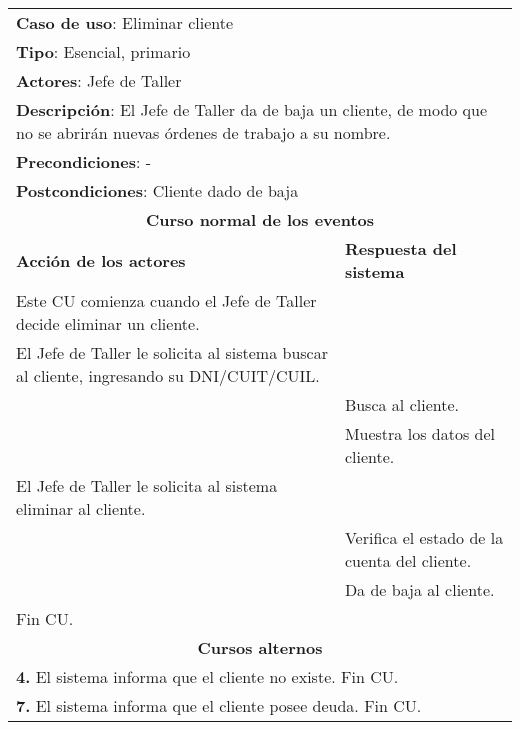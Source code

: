 


	\begin{longtable}{ |p{8cm}|p{8cm}| }
		\hline
		\multicolumn{2}{|p{16cm}|}{\textbf{Caso de uso}: Eliminar cliente}\\
		\multicolumn{2}{|p{16cm}|}{\textbf{Tipo}: Esencial, primario}\\
		\multicolumn{2}{|p{16cm}|}{\textbf{Actores}: Jefe de Taller}\\
		\multicolumn{2}{|p{16cm}|}{\textbf{Descripción}: El Jefe de Taller da de baja un cliente, de modo que no se abrirán nuevas órdenes de trabajo a su nombre.}\\
		\multicolumn{2}{|p{16cm}|}{\textbf{Precondiciones}: -}\\
		\multicolumn{2}{|p{16cm}|}{\textbf{Postcondiciones}: Cliente dado de baja}\\
		\hline
		\multicolumn{2}{|c|}{\textbf{Curso normal de los eventos}}\\
		\hline
		\textbf{Acción de los actores} & \textbf{Respuesta del sistema}\\
		\hline
			\inc Este CU comienza cuando el Jefe de Taller decide eliminar un cliente.& \\
			\hline
			\inc  El Jefe de Taller le solicita al sistema buscar al cliente, ingresando su DNI/CUIT/CUIL. & \\
			\hline
			& \inc Busca al cliente. \\
			\hline
			& \inc Muestra los datos del cliente. \\
			\hline
			\inc El Jefe de Taller le solicita al sistema eliminar al cliente.&\\
			\hline
			& \inc Verifica el estado de la cuenta del cliente. \\
			\hline
			& \inc Da de baja al cliente. \\
			\hline
			\inc Fin CU. & \\
		\hline
		\multicolumn{2}{|c|}{\textbf{Cursos alternos}}\\
		\hline
		\multicolumn{2}{|p{16cm}|}{\textbf{4. }El sistema informa que el cliente no existe. Fin CU.}\\
		\hline
		\multicolumn{2}{|p{16cm}|}{\textbf{7. }El sistema informa que el cliente posee deuda. Fin CU.}\\
		\hline	
	\end{longtable}

